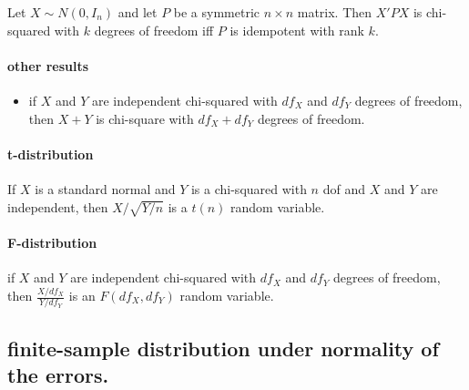        Let $X \sim N(0, I_n)$ and let $P$ be a symmetric $n\times n$
       matrix.  Then $X'PX$ is chi-squared with $k$ degrees of freedom
       iff $P$ is idempotent with rank $k$.
\paragraph{other results}
\label{sec-3-2-2-1-3}

\begin{itemize}
\item if $X$ and $Y$ are independent chi-squared with $df_X$ and
         $df_Y$ degrees of freedom, then $X + Y$ is chi-square with
         $df_X + df_Y$ degrees of freedom.
\end{itemize}
\paragraph{t-distribution}
\label{sec-3-2-2-2}

      If $X$ is a standard normal and $Y$ is a chi-squared with $n$ dof
      and $X$ and $Y$ are independent, then $X/\sqrt{Y/n}$ is a $t(n)$
      random variable.
\paragraph{F-distribution}
\label{sec-3-2-2-3}

       if $X$ and $Y$ are independent chi-squared with $df_X$ and $df_Y$
       degrees of freedom, then $\frac{X/df_X}{Y/df_Y}$ is an $F(df_X,
       df_Y)$ random variable.
\subsection{finite-sample distribution under normality of the errors.}
\label{sec-3-3}

